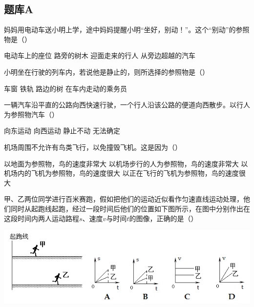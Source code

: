 \documentclass[12pt]{exam}%
\begin{document}
\begin{Aquestions}
\newpage
\section{题库A}
\begin{questions}
\question
妈妈用电动车送小明上学，途中妈妈提醒小明“坐好，别动！”。这个“别动”的参照物是（\answerline*[A]）

\begin{choices}
\choice 电动车上的座位
\choice 路旁的树木
\choice 迎面走来的行人 
\choice 从旁边超越的汽车
\end{choices}


\question
小明坐在行驶的列车内，若说他是静止的，则所选择的参照物是（）\par
\begin{oneparchoices}
\choice 车窗
\choice 铁轨
\choice 路边的树
\choice 在车内走动的乘务员
\end{oneparchoices}


\question
一辆汽车沿平直的公路向西快速行驶，一个行人沿该公路的便道向西散步。以行人为参照物汽车（\answerline*[B]）

\begin{choices}
\choice 向东运动
\choice 向西运动
\choice 静止不动
\choice 无法确定
\end{choices}


\question
机场周围不允许有鸟类飞行，以免撞毁飞机。这是因为（\answerline*[D]）
\begin{choices}
\choice 以地面为参照物，鸟的速度非常大
\choice 以机场步行的人为参照物，鸟的速度非常大
\choice 以机场内的飞机为参照物，鸟的速度很大
\choice 以正在飞行的飞机为参照物，鸟的速度很大
\end{choices}


\question
甲、乙两位同学进行百米赛跑，假如把他们的运动近似看作匀速直线运动处理，他们同时从起跑线起跑，经过一段时间后他们的位置如下图所示，在图中分别作出在这段时间内两人运动路程$s$、速度$v$与时间$t$的图像，正确的是（\answerline*[B]）

\includegraphics[scale=0.8]{figures/图片7.png} 



\end{questions}
\end{Aquestions}
\end{document}
